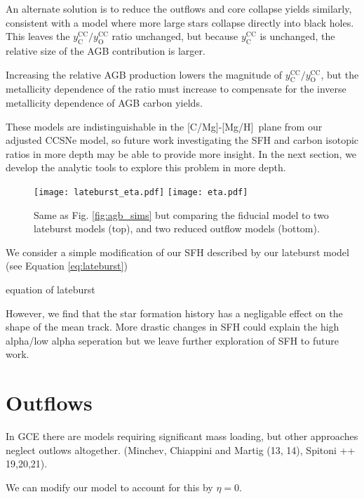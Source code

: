 \documentclass[12pt,oneside]{report}
\newcommand{\caah}{[C/Mg]-[Mg/H]}
\begin{document}
An alternate solution is to reduce the outflows and core collapse yields similarly, consistent with a model where more large stars collapse directly into black holes. This leaves the $y_\text{C}^\text{CC}/y_\text{O}^\text{CC}$ ratio unchanged, but because $y_\text{C}^\text{CC}$ is unchanged, the relative size of the AGB contribution is larger. 


Increasing the relative AGB production lowers the magnitude of  $y_\text{C}^\text{CC}/y_\text{O}^\text{CC}$, but the metallicity dependence of the ratio must increase to compensate for the inverse metallicity dependence of AGB carbon yields. 

These models are indistinguishable in the \caah~plane from our adjusted CCSNe model, so future work investigating the SFH and carbon isotopic ratios in more depth may be able to provide more insight. In the next section, we develop the analytic tools to explore this problem in more depth. 




\begin{figure}
\centering
\texttt{[image: lateburst\_eta.pdf]}
\texttt{[image: eta.pdf]}

\caption[Lateburst and reduced-outflow models]{Same as Fig. \ref{fig:agb_sims} but comparing the fiducial model to two lateburst models (top), and two reduced outflow models (bottom).}
\end{figure}

We consider a simple modification of our SFH described by our lateburst model
(see Equation \ref{eq:lateburst})

equation of lateburst

However, we find that the star formation history has a negligable effect on the shape of the mean track. More drastic changes in SFH could explain the high alpha/low alpha seperation but we leave further exploration of SFH to future work. 








\section{Outflows}

In GCE there are models requiring significant mass loading, but other approaches neglect outlows altogether. (Minchev, Chiappini and Martig (13, 14), Spitoni ++ 19,20,21). 

We can modify our model to account for this by $\eta=0$. 
\end{document}

